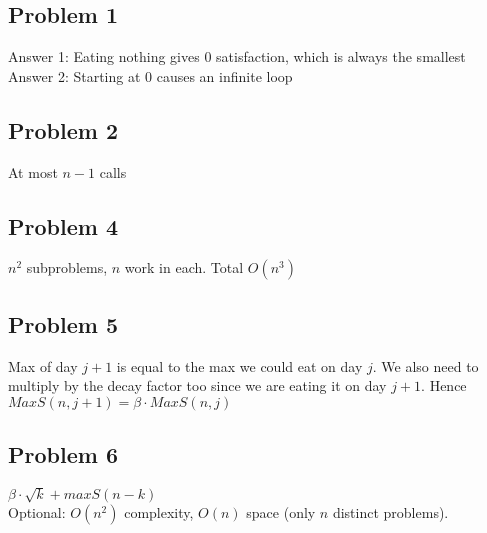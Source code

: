 \documentclass{article}
\begin{document}
\subsection*{Problem 1}
Answer 1: Eating nothing gives 0 satisfaction, which is always the smallest\\
Answer 2: Starting at 0 causes an infinite loop

\subsection*{Problem 2}
At most $n-1$ calls

\subsection*{Problem 4}
$n^2$ subproblems, $n$ work in each. Total $O(n^3)$

\subsection*{Problem 5}
Max of day $j+1$ is equal to the max we could eat on day $j$. We also need to multiply by the decay factor too since we are eating it on day $j+1$. Hence $MaxS(n, j+1) = \beta \cdot MaxS(n,j)$

\subsection*{Problem 6}
$\beta \cdot \sqrt{k} + maxS(n-k)$\\

\noindent Optional: $O(n^2)$ complexity, $O(n)$ space (only $n$ distinct problems).
\end{document}
